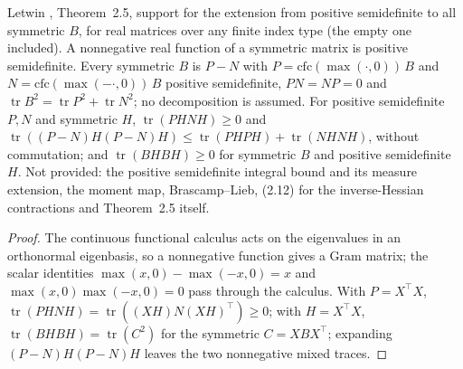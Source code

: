 \begin{lemma}
  \label{lem:letwin-symmetric-jordan}
  \leanok
  Letwin \cite{Letwin2026QuadraticKLS}, Theorem~2.5, support for the extension from positive semidefinite to all
  symmetric $B$, for real matrices over any finite index type (the empty one included).  A nonnegative real function of a
  symmetric matrix is positive semidefinite.  Every symmetric $B$ is $P-N$ with $P=\mathrm{cfc}(\max(\cdot,0))\,B$ and
  $N=\mathrm{cfc}(\max(-\cdot,0))\,B$ positive semidefinite, $PN=NP=0$ and $\operatorname{tr}B^2=\operatorname{tr}P^2+
  \operatorname{tr}N^2$; no decomposition is assumed.  For positive semidefinite $P,N$ and symmetric $H$,
  $\operatorname{tr}(PHNH)\ge0$ and $\operatorname{tr}((P-N)H(P-N)H)\le\operatorname{tr}(PHPH)+\operatorname{tr}(NHNH)$,
  without commutation; and $\operatorname{tr}(BHBH)\ge0$ for symmetric $B$ and positive semidefinite $H$.  Not provided:
  the positive semidefinite integral bound and its measure extension, the moment map, Brascamp--Lieb, (2.12) for the
  inverse-Hessian contractions and Theorem~2.5 itself.
\end{lemma}
\begin{proof}
  \leanok
  The continuous functional calculus acts on the eigenvalues in an orthonormal eigenbasis, so a nonnegative function
  gives a Gram matrix; the scalar identities $\max(x,0)-\max(-x,0)=x$ and $\max(x,0)\max(-x,0)=0$ pass through the
  calculus.  With $P=X^{\top}X$, $\operatorname{tr}(PHNH)=\operatorname{tr}((XH)N(XH)^{\top})\ge0$; with $H=X^{\top}X$,
  $\operatorname{tr}(BHBH)=\operatorname{tr}(C^2)$ for the symmetric $C=XBX^{\top}$; expanding $(P-N)H(P-N)H$ leaves the
  two nonnegative mixed traces.
\end{proof}

